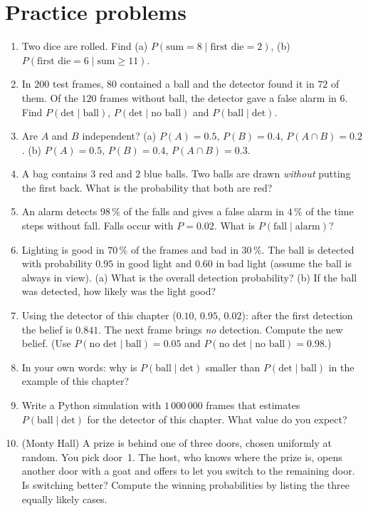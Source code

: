 \section*{Practice problems}
\begin{enumerate}[label=\textbf{\thechapter.\arabic*}]
  \item Two dice are rolled. Find (a) $P(\text{sum}=8\mid\text{first die}=2)$, (b) $P(\text{first die}=6\mid\text{sum}\ge11)$.
  \item In $200$ test frames, $80$ contained a ball and the detector found it in $72$ of them. Of the $120$ frames without ball, the detector gave a false alarm in $6$. Find $P(\text{det}\mid\text{ball})$, $P(\text{det}\mid\text{no ball})$ and $P(\text{ball}\mid\text{det})$.
  \item Are $A$ and $B$ independent? (a) $P(A)=0.5$, $P(B)=0.4$, $P(A\cap B)=0.2$. (b) $P(A)=0.5$, $P(B)=0.4$, $P(A\cap B)=0.3$.
  \item A bag contains $3$ red and $2$ blue balls. Two balls are drawn \emph{without} putting the first back. What is the probability that both are red?
  \item An alarm detects $98\,\%$ of the falls and gives a false alarm in $4\,\%$ of the time steps without fall. Falls occur with $P=0.02$. What is $P(\text{fall}\mid\text{alarm})$?
  \item Lighting is good in $70\,\%$ of the frames and bad in $30\,\%$. The ball is detected with probability $0.95$ in good light and $0.60$ in bad light (assume the ball is always in view). (a) What is the overall detection probability? (b) If the ball was detected, how likely was the light good?
  \item Using the detector of this chapter ($0.10$, $0.95$, $0.02$): after the first detection the belief is $0.841$. The next frame brings \emph{no} detection. Compute the new belief. (Use $P(\text{no det}\mid\text{ball})=0.05$ and $P(\text{no det}\mid\text{no ball})=0.98$.)
  \item In your own words: why is $P(\text{ball}\mid\text{det})$ smaller than $P(\text{det}\mid\text{ball})$ in the example of this chapter?
  \item Write a Python simulation with $1\,000\,000$ frames that estimates $P(\text{ball}\mid\text{det})$ for the detector of this chapter. What value do you expect?
  \item[\textbf{\thechapter.10}$\star$] (Monty Hall) A prize is behind one of three doors, chosen uniformly at random. You pick door~1. The host, who knows where the prize is, opens another door with a goat and offers to let you switch to the remaining door. Is switching better? Compute the winning probabilities by listing the three equally likely cases.
\end{enumerate}
